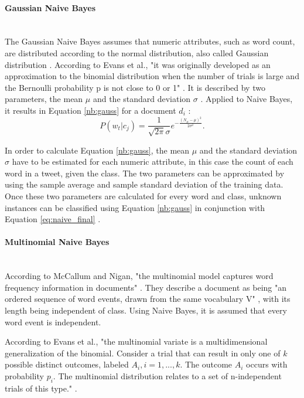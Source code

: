         \paragraph{Gaussian Naive Bayes} \mbox{} \\

        The Gaussian Naive Bayes assumes that numeric attributes, such as word count, are distributed according to the normal distribution, also called Gaussian distribution \cite{nb_gauss}. According to Evans et al., "it was originally developed as an approximation to the binomial distribution when the number of trials is large and the Bernoulli probability p is not close to 0 or 1" \cite[p.~143]{evans2011statistical}. It is described by two parameters, the mean $\mu$ and the standard deviation $\sigma$ \cite{evans2011statistical}. Applied to Naive Bayes, it results in Equation \eqref{nb:gauss} for a document $d_i$ \cite{nb_gauss}:
        \begin{equation}
        \label{nb:gauss}
            P(w_t|c_j) = \frac{1}{\sqrt{2\pi}\sigma}e^{-\frac{(N_{it}-\mu)^2}{2\sigma^2}}.
        \end{equation}
       
        In order to calculate Equation \eqref{nb:gauss}, the mean $\mu$ and the standard deviation $\sigma$ have to be estimated for each numeric attribute, in this case the count of each word in a tweet, given the class. The two parameters can be approximated by using the sample average and sample standard deviation of the training data. Once these two parameters are calculated for every word and class, unknown instances can be classified using Equation \eqref{nb:gauss} in conjunction with Equation \eqref{eq:naive_final} \cite{nb_gauss}.
        
        \paragraph{Multinomial Naive Bayes} \mbox{} \\

        According to McCallum and Nigan, "the multinomial model captures word frequency information in documents" \cite[p.~3]{Mccallum1998}. They describe a document as being "an ordered sequence of word events, drawn from the same vocabulary V" \cite[p.~3]{Mccallum1998}, with its length being independent of class. Using Naive Bayes, it is assumed that every word event is independent.
        
        According to Evans et al., "the multinomial variate is a multidimensional generalization of the binomial. Consider a trial that can result in only one of $k$ possible distinct outcomes, labeled $A_i, i = 1,...,k$. The outcome $A_i$ occurs with probability $p_i$. The multinomial distribution relates to a set of n-independent trials of this type." \cite[p.~135]{evans2011statistical}.
        
